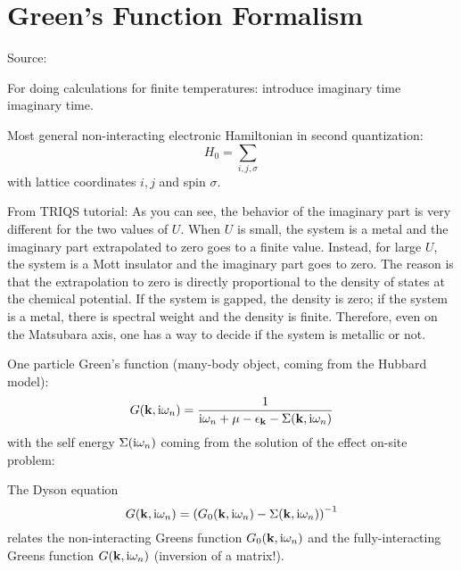 \chapter{Green's Function Formalism}\label{ch:green's-function-formalism}

Source:~\cite{Bruus_Flensberg_2004}



For doing calculations for finite temperatures: introduce imaginary time \gls{imaginary time}.

Most general non-interacting electronic Hamiltonian in second quantization:
\begin{equation}
    H_0 = \sum_{i, j, \sigma}
\end{equation}
with lattice coordinates \(i, j\) and spin \(\sigma\).


From TRIQS tutorial:
As you can see, the behavior of the imaginary part is very different for the two values of $U$. When
$U$ is small, the system is a metal and the imaginary part extrapolated to zero goes to a finite value.
Instead, for large $U$, the system is a Mott insulator and the imaginary part goes to zero. The reason
is that the extrapolation to zero is directly proportional to the density of states at the chemical
potential. If the system is gapped, the density is zero; if the system is a metal, there is spectral
weight and the density is finite. Therefore, even on the Matsubara axis, one has a way to decide if the
system is metallic or not. 

One particle Green's function (many-body object, coming from the Hubbard model):
\begin{equation}
    G(\bm{\mathrm{k}}, \mathrm{i} \omega_n) = \frac{1}{\mathrm{i} \omega_n + \mu - \epsilon_{\bm{\mathrm{k}}} - \Sigma(\bm{\mathrm{k}}, \mathrm{i} \omega_n)}
\end{equation}
with the self energy \(\Sigma(\mathrm{i} \omega_n)\) coming from the solution of the effect on-site problem:

The Dyson equation
\begin{equation}
    G(\bm{\mathrm{k}}, \mathrm{i} \omega_n) = \left( G_0 (\bm{\mathrm{k}}, \mathrm{i} \omega_n) - \Sigma(\bm{\mathrm{k}}, \mathrm{i} \omega_n)\right)^{-1}
\end{equation}
relates the non-interacting Greens function \(G_0 (\bm{\mathrm{k}}, \mathrm{i} \omega_n)\) and the fully-interacting Greens function \(G (\bm{\mathrm{k}}, \mathrm{i} \omega_n)\) (inversion of a matrix!).

